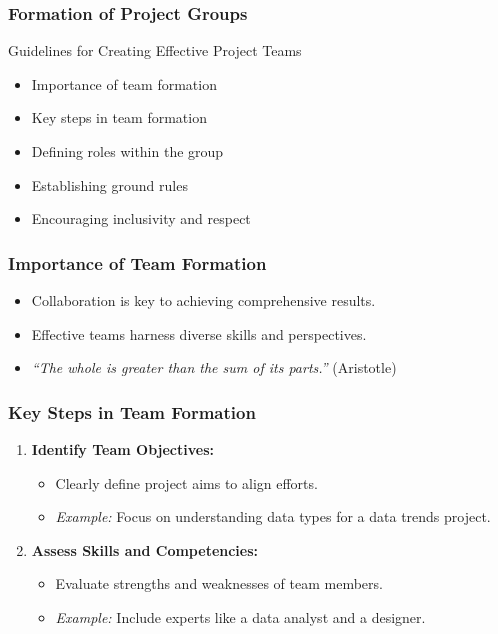 \documentclass[aspectratio=169]{beamer}
\begin{document}
\begin{frame}[fragile]
    \frametitle{Formation of Project Groups}
    \begin{block}{Guidelines for Creating Effective Project Teams}
        \begin{itemize}
            \item Importance of team formation
            \item Key steps in team formation
            \item Defining roles within the group
            \item Establishing ground rules
            \item Encouraging inclusivity and respect
        \end{itemize}
    \end{block}
\end{frame}

\begin{frame}[fragile]
    \frametitle{Importance of Team Formation}
    \begin{itemize}
        \item Collaboration is key to achieving comprehensive results. 
        \item Effective teams harness diverse skills and perspectives.
        \item \textit{“The whole is greater than the sum of its parts.”} (Aristotle)
    \end{itemize}
\end{frame}

\begin{frame}[fragile]
    \frametitle{Key Steps in Team Formation}
    \begin{enumerate}
        \item \textbf{Identify Team Objectives:}
          \begin{itemize}
              \item Clearly define project aims to align efforts.
              \item \textit{Example:} Focus on understanding data types for a data trends project.
          \end{itemize}
        \item \textbf{Assess Skills and Competencies:}
          \begin{itemize}
              \item Evaluate strengths and weaknesses of team members.
              \item \textit{Example:} Include experts like a data analyst and a designer.
          \end{itemize}
    \end{enumerate}
\end{frame}
\end{document}
